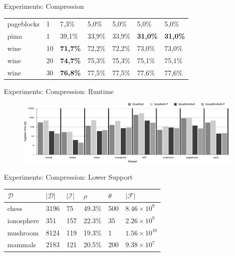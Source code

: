 \documentclass{beamer}
\newcommand{\dataset}{\mathcal{D}}
\newcommand{\itemset}{\mathcal{I}}
\newcommand{\setitemsets}{\mathcal{F}}
\begin{document}
\begin{frame}{Experiments: Compression}
\begin{table}[H]
{\begin{tabular}{ll||l|l|l|l|l}
pageblocks                   & 1                 & 7,3\%                & 5,0\%          & 5,0\%             & 5,0\%              & 5,0\%                 \\
pima                         & 1                 & 39,1\%               & 33,9\%         & 33,9\%            & \textbf{31,0\%}             & \textbf{31,0\%}                \\
wine                         & 10                & \textbf{71,7\%}               & 72,2\%         & 72,2\%            & 73,0\%             & 73,0\%                \\
wine                         & 20                & \textbf{74,7\%}              & 75,3\%         & 75,3\%            & 75,1\%             & 75,1\%                \\
wine                         & 30                & \textbf{76,8\%}              & 77,5\%         & 77,5\%            & 77,6\%             & 77,6\%               
\end{tabular}
}
\end{table}
\end{frame}

\begin{frame}{Experiments: Compression: Runtime}
\begin{figure}
  \centering
  \includegraphics[width=\textwidth]{img/log-run-time}
\end{figure}
\end{frame}


\begin{frame}{Experiments: Compression: Lower Support}
\begin{table}[H]
\centering
\begin{tabular}{l||l|l|l|l|l}
$\dataset$    & $|\dataset|$  & $|\itemset|$ & $\rho$  & $\theta$    & $|\setitemsets|$  \\ \hline             
chess         & 3196          & 75           & 49.3\%  & 500         & $8.46\times10^{9}$ \\
ionosphere    & 351           & 157          & 22.3\%  & 35          & $2.26\times10^{9}$ \\
mushroom      & 8124          & 119          & 19.3\%  & 1           & $1.56\times10^{10}$ \\
mammals       & 2183          & 121          & 20.5\%  & 200         & $9.38\times10^{7}$
\end{tabular}
\end{table}
\end{frame}
\end{document}
